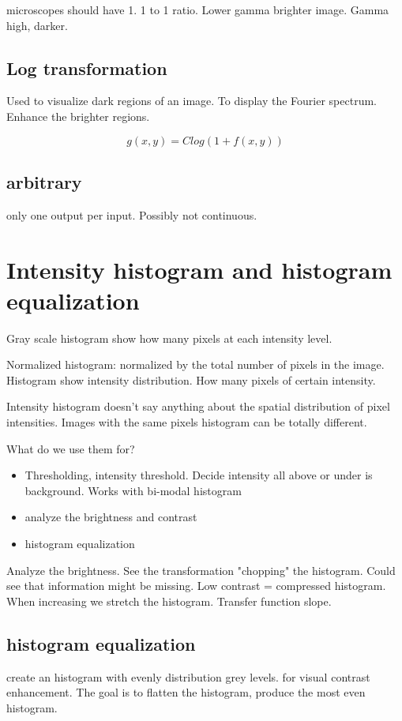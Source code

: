 \documentclass[a4paper]{article}
\begin{document}
microscopes should have 1. 1 to 1 ratio. Lower gamma brighter image. Gamma high, darker. 

\subsection{Log transformation}
Used to visualize dark regions of an image. To display the Fourier spectrum. Enhance the brighter regions. 

\begin{equation}
g(x,y) = Clog(1 + f(x,y))
\end{equation}

\subsection{arbitrary}
only one output per input. Possibly not continuous.


\section{Intensity histogram and histogram equalization}

Gray scale histogram show how many pixels at each intensity level. 

Normalized histogram: normalized by the total number of pixels in the image. Histogram show intensity distribution. How many pixels of certain intensity.

Intensity histogram doesn't say anything about the spatial distribution of pixel intensities. Images with the same pixels histogram can  be totally different.

What do we use them for? 
\begin{itemize}
    \item Thresholding, intensity threshold. Decide intensity all above or under is background. Works with bi-modal histogram
    \item analyze the brightness and contrast
    \item histogram equalization
\end{itemize}

Analyze the brightness. See the transformation "chopping" the histogram. Could see that information might be missing. Low contrast = compressed histogram. When increasing we stretch the histogram. Transfer function slope. 

\subsection{histogram equalization}
create an histogram with evenly distribution grey levels. for visual contrast enhancement. The goal is to flatten the histogram, produce the most even histogram. 
\end{document}
